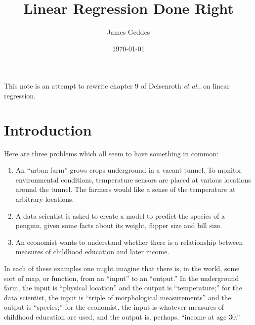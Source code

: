 \documentclass[10pt, a4paper]{article}
\author{James Geddes}
\date{\today}
\title{Linear Regression Done Right}
\begin{document}
\maketitle

This note is an attempt to rewrite chapter 9 of Deisenroth \emph{et
al.}, on linear regression.

\section*{Introduction}

Here are three problems which all seem to have something in common:

\begin{enumerate}
\item An ``urban farm'' grows crops underground in a vacant tunnel. To
  monitor environmental conditions, temperature sensors are placed at
  various locations around the tunnel. The farmers would like a sense
  of the temperature at arbitrary locations.
\item A data scientist is asked to create a model to predict the
  species of a penguin, given some facts about its weight, flipper
  size and bill size.
\item An economist wants to understand whether there is a relationship
  between measures of childhood education and later income.
\end{enumerate}

In each of these examples one might imagine that there is, in the
world, some sort of map, or function, from an “input” to an “output.”
In the underground farm, the input is “physical location” and the
output is “temperature;” for the data scientist, the input is “triple
of morphological measurements” and the output is “species;” for the
economist, the input is whatever measures of childhood education are
used, and the output is, perhaps, “income at age 30.”
\end{document}
